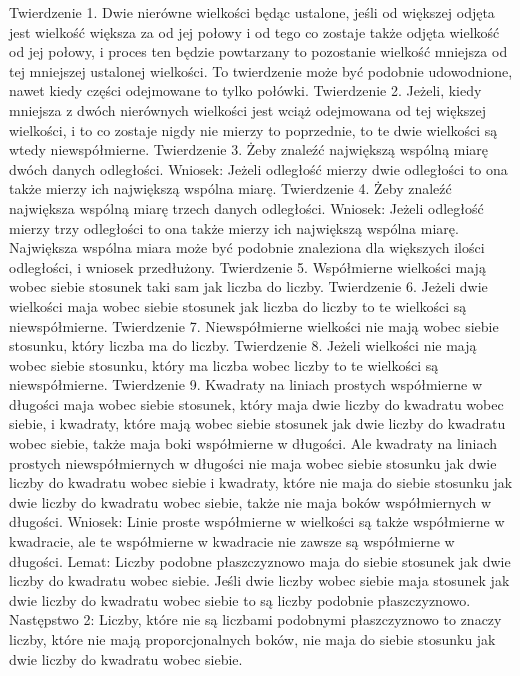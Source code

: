     Twierdzenie 1.
        Dwie nierówne wielkości będąc ustalone, jeśli od większej odjęta jest wielkość większa za od jej połowy i od tego co zostaje także odjęta wielkość od jej połowy, i proces ten będzie powtarzany to pozostanie wielkość mniejsza od tej mniejszej ustalonej wielkości. To twierdzenie może być podobnie udowodnione, nawet kiedy części odejmowane to tylko połówki.
    Twierdzenie 2.
        Jeżeli, kiedy mniejsza z dwóch nierównych wielkości jest wciąż odejmowana od tej większej wielkości, i to co zostaje nigdy nie mierzy to poprzednie, to te dwie wielkości są wtedy niewspółmierne.
    Twierdzenie 3.
        Żeby znaleźć największą wspólną miarę dwóch danych odległości.
        Wniosek:
        Jeżeli odległość mierzy dwie odległości to ona także mierzy ich największą wspólna miarę.
    Twierdzenie 4.
        Żeby znaleźć największa wspólną miarę trzech danych odległości.
        Wniosek:
        Jeżeli odległość mierzy trzy odległości to ona także mierzy ich największą wspólna miarę. Największa wspólna miara może być podobnie znaleziona dla większych ilości odległości, i wniosek przedłużony.
    Twierdzenie 5.
        Współmierne wielkości mają wobec siebie stosunek taki sam jak liczba do liczby.
    Twierdzenie 6.
        Jeżeli dwie wielkości maja wobec siebie stosunek jak liczba do liczby to te wielkości są niewspółmierne.
    Twierdzenie 7.
        Niewspółmierne wielkości nie mają wobec siebie stosunku, który liczba ma do liczby.
    Twierdzenie 8.
        Jeżeli wielkości nie mają wobec siebie stosunku, który ma liczba wobec liczby to te wielkości są niewspółmierne.
    Twierdzenie 9.
        Kwadraty na liniach prostych współmierne w długości maja wobec siebie stosunek, który maja dwie liczby do kwadratu wobec siebie, i kwadraty, które mają wobec siebie stosunek jak dwie liczby do kwadratu wobec siebie, także maja boki współmierne w długości. Ale kwadraty na liniach prostych niewspółmiernych w długości nie maja wobec siebie stosunku jak dwie liczby do kwadratu wobec siebie i kwadraty, które nie maja do siebie stosunku jak dwie liczby do kwadratu wobec siebie, także nie maja boków współmiernych w długości.
        Wniosek:
        Linie proste współmierne w wielkości są także współmierne w kwadracie, ale te współmierne w kwadracie nie zawsze są współmierne w długości.
        Lemat:
        Liczby podobne płaszczyznowo maja do siebie stosunek jak dwie liczby do kwadratu wobec siebie. Jeśli dwie liczby wobec siebie maja stosunek jak dwie liczby do kwadratu wobec siebie to są liczby podobnie płaszczyznowo.
        Następstwo 2:
        Liczby, które nie są liczbami podobnymi płaszczyznowo to znaczy liczby, które nie mają proporcjonalnych boków, nie maja do siebie stosunku jak dwie liczby do kwadratu wobec siebie.
